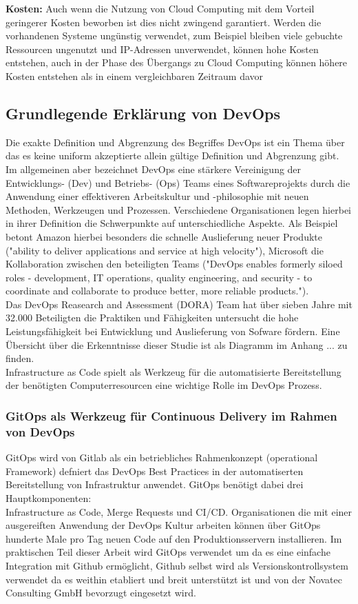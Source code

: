 \begin{spacing}{1.2}
\textbf{Kosten:} Auch wenn die Nutzung von Cloud Computing mit dem Vorteil
geringerer Kosten beworben ist dies nicht zwingend garantiert. Werden die
vorhandenen Systeme ungünstig verwendet, zum Beispiel bleiben viele gebuchte
Ressourcen ungenutzt und IP-Adressen unverwendet, können hohe Kosten entstehen,
auch in der Phase des Übergangs zu Cloud Computing können höhere Kosten
entstehen als in einem vergleichbaren Zeitraum davor


\subsection{\textbf{Grundlegende Erklärung von DevOps}}

Die exakte Definition und Abgrenzung des Begriffes DevOps ist ein Thema über
das es keine uniform akzeptierte allein gültige Definition und Abgrenzung gibt.
Im allgemeinen aber bezeichnet DevOps eine stärkere Vereinigung der Entwicklungs-
(Dev) und Betriebs- (Ops) Teams eines Softwareprojekts durch die Anwendung
einer effektiveren Arbeitskultur und -philosophie mit neuen Methoden, Werkzeugen und
Prozessen. Verschiedene Organisationen legen hierbei in ihrer Definition die
Schwerpunkte auf unterschiedliche Aspekte.
Als Beispiel betont Amazon hierbei besonders die schnelle Auslieferung neuer
Produkte ("ability to deliver applications and service at high velocity"),
Microsoft
die Kollaboration zwischen den beteiligten Teams ("DevOps enables formerly
siloed roles - development, IT operations, quality engineering, and security -
to coordinate and collaborate to produce better, more reliable products.").\\
Das DevOps Reasearch and Assessment (DORA) Team
hat über sieben Jahre mit 32.000 Beteiligten die Praktiken und 
Fähigkeiten untersucht die hohe Leistungsfähigkeit bei Entwicklung und
Auslieferung von Sofware fördern. Eine Übersicht über die Erkenntnisse dieser
Studie ist als Diagramm im Anhang ... zu finden.\\
Infrastructure as Code spielt als Werkzeug für die automatisierte Bereitstellung
der benötigten Computerresourcen eine wichtige Rolle im DevOps Prozess.

\subsubsection{\textbf{GitOps als Werkzeug für Continuous Delivery im Rahmen von DevOps}}

GitOps wird von Gitlab als ein betriebliches Rahmenkonzept (operational
Framework) defniert das DevOps Best Practices in der automatiserten
Bereitstellung von Infrastruktur anwendet.
GitOps benötigt dabei drei Hauptkomponenten:\\
Infrastructure as Code, Merge Requests und CI/CD.
Organisationen die mit einer ausgereiften Anwendung der DevOps Kultur arbeiten
können über GitOps hunderte Male pro Tag neuen Code auf den Produktionsservern
installieren. Im praktischen Teil dieser Arbeit wird GitOps verwendet um
da es eine einfache Integration mit Github ermöglicht, Github selbst
wird als Versionskontrollsystem verwendet da es weithin etabliert und breit
unterstützt ist und von der Novatec Consulting GmbH bevorzugt eingesetzt wird.


\end{spacing}
